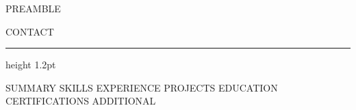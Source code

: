 %
%
{{PREAMBLE}}


\renewcommand{\cvsectionfont}[1]{{\large\bfseries\color{cvaccent} #1}}
\renewcommand{\cvsectionrule}{\vspace{2pt}{\color{cvaccent}\hrule height 0.9pt}}

\renewcommand{\cvheader}[2]{%
  \cvsplit{{\fontsize{23}{26}\selectfont\bfseries\color{cvaccent} #1}}%
          {\parbox[b]{0.44\linewidth}{\raggedleft\small\color{cvmuted} #2}}%
  \vspace{5pt}%
  {\color{cvaccent}\hrule height 1.2pt}%
  \vspace{2pt}%
}



\cvheader{ {{NAME}} }{ {{CONTACT}} }

{{SUMMARY}}
{{SKILLS}}
{{EXPERIENCE}}
{{PROJECTS}}
{{EDUCATION}}
{{CERTIFICATIONS}}
{{ADDITIONAL}}


